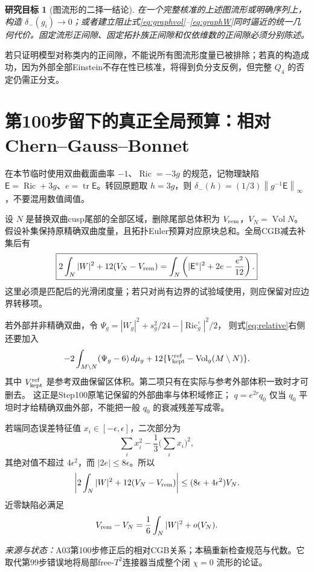 \documentclass[UTF8,a4paper,11pt,fontset=fandol]{ctexart}
\numberwithin{equation}{section}
\newtheorem{target}[theorem]{研究目标}
\theoremstyle{definition}
\newcommand{\Ric}{\operatorname{Ric}}
\newcommand{\Vol}{\operatorname{Vol}}
\newcommand{\tr}{\operatorname{tr}}
\newcommand{\dd}{\,d\mu_g}
\newcommand{\norm}[1]{\left\lVert#1\right\rVert}
\newcommand{\source}[1]{\par\noindent\textit{来源与状态：}#1\par}
\begin{document}
\begin{target}[图流形的二择一结论]
在一个完整核准的上述图流形或明确序列上，构造 $\delta_-(g_i)\to0$；或者建立阻止式\eqref{eq:graphvol}--\eqref{eq:graphW}同时逼近的统一几何代价。固定流形正间隙、固定拓扑族正间隙和仅依维数的正间隙必须分别陈述。
\end{target}
若只证明模型对称类内的正间隙，不能说所有图流形度量已被排除；若真的构造成功，因为外部全部Einstein不存在性已核准，将得到负分支反例，但完整 $Q_4$ 的否定仍需正分支。

\section{第100步留下的真正全局预算：相对Chern--Gauss--Bonnet}
在本节临时使用双曲截面曲率 $-1$、$\Ric=-3g$ 的规范，记物理缺陷 $\mathsf E=\Ric+3g$、$e=\tr\mathsf E$。转回原题取 $h=3g$，则 $\delta_-(h)=(1/3)\norm{g^{-1}\mathsf E}_\infty$，不要混用数值阈值。

设 $N$ 是替换双曲cusp尾部的全部区域，删除尾部总体积为 $V_{\rm rem}$，$V_N=\Vol N$。假设补集保持原精确双曲度量，且拓扑Euler预算对应原块总和。全局CGB减去补集后有
\begin{equation}\label{eq:relative}
\boxed{
2\int_N|W|^2+12(V_N-V_{\rm rem})
=\int_N\left(|\mathsf E^\circ|^2+2e-\frac{e^2}{12}\right).}
\end{equation}
这里必须是匹配后的光滑闭度量；若只对尚有边界的试验域使用，则应保留对应边界转移项。

若外部并非精确双曲，令
$\Psi_g=|W_g|^2+s_g^2/24-|\Ric_g^\circ|^2/2$，
则式\eqref{eq:relative}右侧还要加入
\[
 -2\int_{M\setminus N}(\Psi_g-6)\dd
 +12\{V_{\rm kept}^{\rm ref}-\Vol_g(M\setminus N)\}.
\]
其中 $V_{\rm kept}^{\rm ref}$ 是参考双曲保留区体积。第二项只有在实际与参考外部体积一致时才可删去。
这正是Step100原笔记保留的外部曲率与体积域修正；
$q=e^{2r}q_0$ 仅当 $q_0$ 平坦时才给精确双曲外部，不能把一般 $q_0$ 的衰减残差写成零。

若端同态误差特征值 $x_i\in[-\epsilon,\epsilon]$，二次部分为
\[
\sum_i x_i^2-\frac13\Big(\sum_i x_i\Big)^2,
\]
其绝对值不超过 $4\epsilon^2$，而 $|2e|\le8\epsilon$。所以
\begin{equation}\label{eq:relativebound}
\left|2\int_N|W|^2+12(V_N-V_{\rm rem})\right|
\le(8\epsilon+4\epsilon^2)V_N.
\end{equation}
近零缺陷必满足
\[
V_{\rm rem}-V_N=\frac16\int_N|W|^2+o(V_N).
\]
\source{A03第100步修正后的相对CGB关系；本稿重新检查规范与代数。它取代第99步错误地将局部free-$T^2$连接器当成整个闭 $\chi=0$ 流形的论证。}
\end{document}
